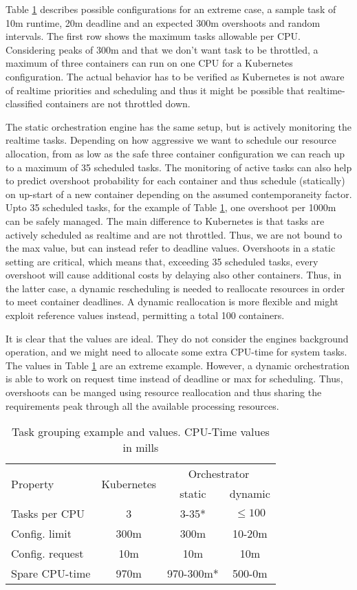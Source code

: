 \documentclass[]{scrartcl}
\begin{document}
Table \ref{tab:taskex} describes possible configurations for an extreme case, a sample task of 10m runtime, 20m deadline and an expected 300m overshoots and random intervals. 
The first row shows the maximum tasks allowable per CPU. Considering peaks of 300m and that we don't want task to be throttled, a maximum of three containers can run on one CPU for a Kubernetes configuration. 
The actual behavior has to be verified as Kubernetes is not aware of realtime priorities and scheduling and thus it might be possible that realtime-classified containers are not throttled down.

The static orchestration engine has the same setup, but is actively monitoring the realtime tasks. 
Depending on how aggressive we want to schedule our resource allocation, from as low as the safe three container configuration we can reach up to a maximum of 35 scheduled tasks. The monitoring of active tasks can also help to predict overshoot probability for each container and thus schedule (statically) on up-start of a new container depending on the assumed contemporaneity factor. Upto 35 scheduled tasks, for the example of Table \ref{tab:taskex}, one overshoot per 1000m can be safely managed.
The main difference to Kubernetes is that tasks are actively scheduled as realtime and are not throttled. Thus, we are not bound to the max value, but can instead refer to deadline values.
Overshoots in a static setting are critical, which means that, exceeding 35 scheduled tasks, every overshoot will cause additional costs by delaying also other containers. Thus, in the latter case, a dynamic rescheduling is needed to reallocate resources in order to meet container deadlines. 
A dynamic reallocation is more flexible and might exploit reference values instead, permitting a total 100 containers.

It is clear that the values are ideal. They do not consider the engines background operation, and we might need to allocate some extra CPU-time for system tasks.
The values in Table \ref{tab:taskex} are an extreme example. However, a dynamic orchestration is able to work on request time instead of deadline or max for scheduling. Thus, overshoots can be manged using resource reallocation and thus sharing the requirements peak through all the available processing resources.


\begin{table}[ht]
	\centering
	\begin{tabular}{l c c c}
		\toprule
		\multirow{2}{*}{Property} & \multirow{2}{*}{Kubernetes} & \multicolumn{2}{c}{Orchestrator} \\
		& & static & dynamic \\
		\midrule
		Tasks per CPU & 3 & 3-35* & $\le100$\\
		Config. limit & 300m & 300m & 10-20m\\
		Config. request & 10m & 10m & 10m \\
		Spare CPU-time & 970m & 970-300m* & 500-0m\\
		\bottomrule
	\end{tabular}
	\caption{Task grouping example and values. CPU-Time values in mills}
	\label{tab:taskex}
\end{table}
\end{document}
